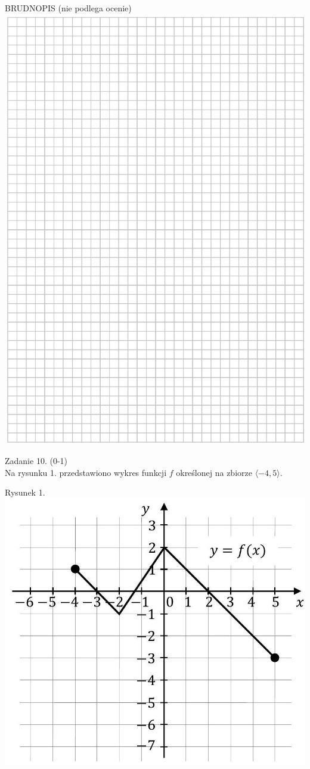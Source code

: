\documentclass[10pt]{article}
\begin{document}
BRUDNOPIS (nie podlega ocenie)\\
\includegraphics[max width=\textwidth, center]{2024_11_21_465acd0c12fa3e05e8a7g-05}

Zadanie 10. (0-1)\\
Na rysunku 1. przedstawiono wykres funkcji \(f\) określonej na zbiorze \(\langle-4,5\rangle\).

Rysunek 1.\\
\includegraphics[max width=\textwidth, center]{2024_11_21_465acd0c12fa3e05e8a7g-06}
\end{document}
